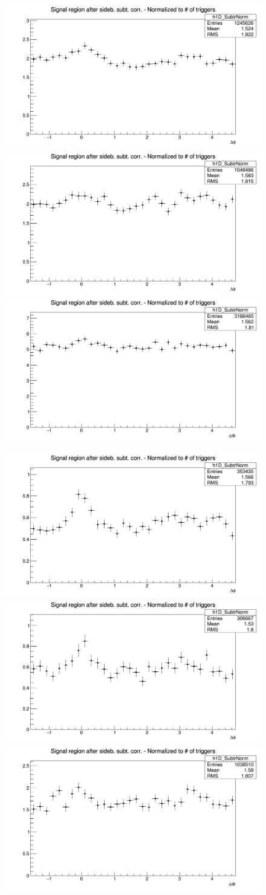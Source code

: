 \begin{figure}[!htbp]
\centering
{\includegraphics[width=0.31\linewidth, height=0.23\linewidth]{figures/Dzero/AzimCorrDistr_Dzero_Canvas_PtIntBins4to5_PoolInt_thrdot3to1dot.png}}
{\includegraphics[width=0.31\linewidth, height=0.23\linewidth]{figures/DplusPlotsweff/AzimCorrDistr_Dplus_Canvas_PtIntBins3to4_PoolInt_thrdot3to1dot.png}}
{\includegraphics[width=0.31\linewidth, height=0.23\linewidth]{figures/Dstar_wEFF/AzimCorrDistr_Dstar_Canvas_PtIntBins2to3_PoolInt_thrdot3to1dot.png}}

{\includegraphics[width=0.31\linewidth, height=0.23\linewidth]{figures/Dzero/AzimCorrDistr_Dzero_Canvas_PtIntBins4to5_PoolInt_thr1dotto2dot.png}}
{\includegraphics[width=0.31\linewidth, height=0.23\linewidth]{figures/DplusPlotsweff/AzimCorrDistr_Dplus_Canvas_PtIntBins3to4_PoolInt_thr1dotto2dot.png}}
{\includegraphics[width=0.31\linewidth, height=0.23\linewidth]{figures/Dstar_wEFF/AzimCorrDistr_Dstar_Canvas_PtIntBins2to3_PoolInt_thr1dotto2dot.png}}


\end{figure}
